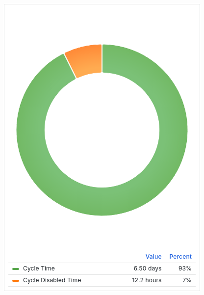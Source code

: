 \documentclass{article}
\begin{document}
\includegraphics[width=\textwidth]{panel_0019-0000.png}
\end{document}

